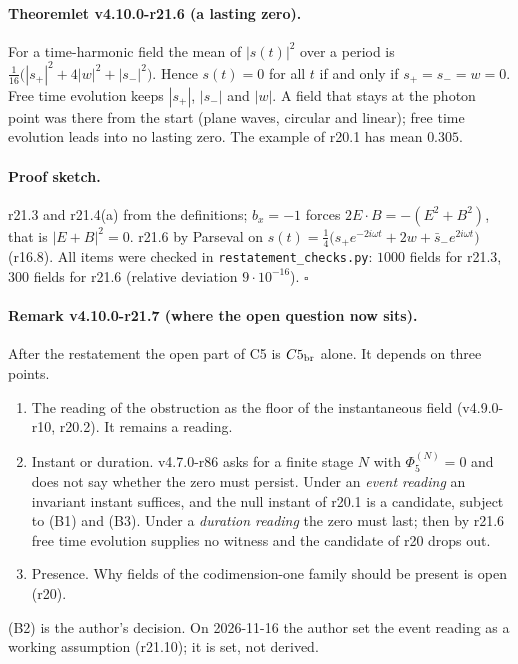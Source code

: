 \paragraph{Theoremlet v4.10.0-r21.6 (a lasting zero).}
For a time-harmonic field the mean of \(|s(t)|^2\) over a period is \(\tfrac1{16}\bigl(|s_+|^2+4|w|^2+|s_-|^2\bigr)\).  Hence \(s(t)=0\) for all \(t\)
if and only if \(s_+=s_-=w=0\).  Free time evolution keeps \(|s_+|\), \(|s_-|\) and \(|w|\).  A field that stays at the photon point was there
from the start (plane waves, circular and linear); free time evolution leads into no lasting zero.  The example of r20.1 has mean
\(0.305\).

\paragraph{Proof sketch.}
r21.3 and r21.4(a) from the definitions; \(b_x=-1\) forces \(2E\cdot B=-(E^2+B^2)\), that is \(|E+B|^2=0\).  r21.6 by Parseval on
\(s(t)=\tfrac14\bigl(s_+e^{-2i\omega t}+2w+\bar s_-e^{2i\omega t}\bigr)\) (r16.8).  All items were checked in
\texttt{restatement\_\allowbreak checks.py}: \(1000\) fields for r21.3, \(300\) fields for r21.6 (relative deviation \(9\cdot10^{-16}\)).  \(\square\)

\paragraph{Remark v4.10.0-r21.7 (where the open question now sits).}
After the restatement the open part of C5 is \(C5_{\rm br}\) alone.  It depends on three points.
\begin{enumerate}[leftmargin=2em]
\item[(B1)] The reading of the obstruction as the floor of the instantaneous field (v4.9.0-r10, r20.2).  It remains a reading.
\item[(B2)] Instant or duration.  v4.7.0-r86 asks for a finite stage \(N\) with \(\Phi_5^{(N)}=0\) and does not say whether the zero must
persist.  Under an \emph{event reading} an invariant instant suffices, and the null instant of r20.1 is a candidate, subject to (B1)
and (B3).  Under a \emph{duration reading} the zero must last; then by r21.6 free time evolution supplies no witness and the
candidate of r20 drops out.
\item[(B3)] Presence.  Why fields of the codimension-one family should be present is open (r20).
\end{enumerate}
(B2) is the author's decision.  On 2026-11-16 the author set the event reading as a working assumption (r21.10); it is set, not derived.

